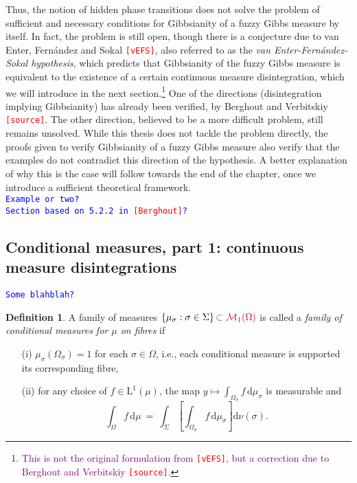 \documentclass[12pt]{article}
\renewcommand{\d}{\mathrm{d}}
\newcommand{\M}{\mathcal{M}}
\newcommand{\set}[1]{\left\{#1\right\}}
\newcommand{\oglati}[1]{\left[#1\right]}
\newcommand{\1}{\mathbbm{1}}
\newcommand{\5}{\vspace{0.5cm}}
\theoremstyle{definition}
\newtheorem{df}[thm]{Definition}
\begin{document}
Thus, the notion of hidden phase transitions does not solve the problem of sufficient and necessary conditions for Gibbsianity of a fuzzy Gibbs measure by itself. In fact, the problem is still open, though there is a conjecture due to van Enter, Fern\'andez and Sokal \textcolor{red}{\texttt{[vEFS]}}, also referred to as the \textit{van Enter-Fern\'andez-Sokal hypothesis}, which predicts that Gibbsianity of the fuzzy Gibbs measure is equivalent to the existence of a certain continuous measure disintegration, which we will introduce in the next section.\footnote{\textcolor{purple}{This is not the original formulation from \textcolor{red}{\texttt{[vEFS]}}, but a correction due to Berghout and Verbitskiy \textcolor{red}{\texttt{[source]}}.}} One of the directions (disintegration implying Gibbsianity) has already been verified, by Berghout and Verbitskiy \textcolor{red}{\texttt{[source]}}. The other direction, believed to be a more difficult problem, still remains unsolved. While this thesis does not tackle the problem directly, the proofs given to verify Gibbsianity of a fuzzy Gibbs measure also verify that the examples do not contradict this direction of the hypothesis. A better explanation of why this is the case will follow towards the end of the chapter, once we introduce a sufficient theoretical framework. \\

\textcolor{blue}{\texttt{Example or two?}} \\

\textcolor{blue}{\texttt{Section based on 5.2.2 in \textcolor{red}{\texttt{[Berghout]}}?}}


\subsection{Conditional measures, part 1: continuous measure disintegrations}

\textcolor{blue}{\texttt{Some blahblah?}}

\begin{df}
A family of measures $\set{\mu_\sigma:\sigma\in\Sigma}\textcolor{purple}{\subset\M_1(\Omega)}$ is called a \textit{family of conditional measures for $\mu$ on fibres} if
\begin{itemize}
	\item[(i)] $\mu_\sigma(\Omega_\sigma)=1$ for each $\sigma\in\Omega$, i.e., each conditional measure is supported its corresponding fibre,
	\item[(ii)] for any choice of $f\in\mathrm{L}^1(\mu)$, the map $y\mapsto\int_{\Omega_\sigma} f\,\d\mu_\sigma$ is measurable and
	$$\int_\Omega f\,\d\mu ~=~ \int_{\Sigma}\!\oglati{\int_{\Omega_\sigma} f\,\d\mu_\sigma}\!\d\nu(\sigma).$$
\end{itemize}
\end{df}
\end{document}
